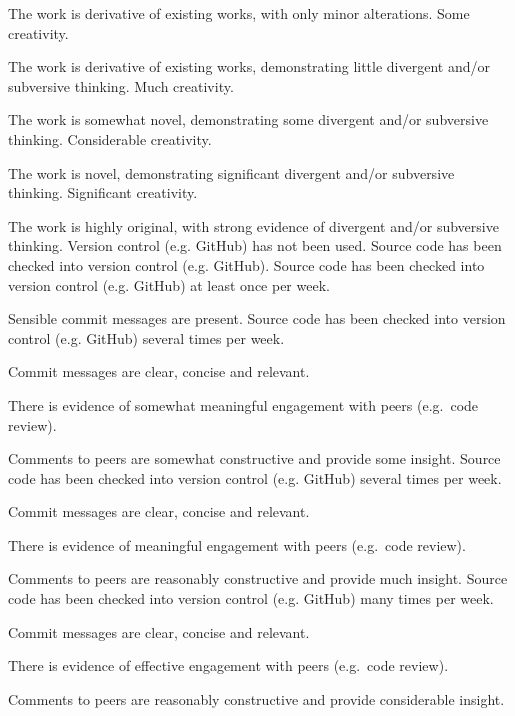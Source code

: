 \documentclass{../../fal_assignment}
\begin{document}
\begin{markingrubric}
	\par The work is derivative of existing works, with only minor alterations.
	\grade Some creativity.
	\par The work is derivative of existing works, demonstrating little divergent and/or subversive thinking.
	\grade Much creativity.
	\par The work is somewhat novel, demonstrating some divergent and/or subversive thinking.
	\grade Considerable creativity.
	\par The work is novel, demonstrating significant divergent and/or subversive thinking.
	\grade Significant creativity.
	\par The work is highly original, with strong evidence of divergent and/or subversive thinking.
	\grade\fail Version control (e.g. GitHub) has not been used.
	\grade Source code has been checked into version control (e.g. GitHub).
	\grade Source code has been checked into version control (e.g. GitHub) at least once per week.
	\par Sensible commit messages are present.
	\grade Source code  has been checked into version control (e.g. GitHub) several times per week.
	\par Commit messages are clear, concise and relevant.
	\par There is evidence of somewhat meaningful engagement with peers (e.g.\ code review).
	\par Comments to peers are somewhat constructive and provide some insight.
	\grade Source code has been checked into version control (e.g. GitHub) several times per week.
	\par Commit messages are clear, concise and relevant.
	\par There is evidence of meaningful engagement with peers (e.g.\ code review).
	\par Comments to peers are reasonably constructive and provide much insight.
	\grade Source code has been checked into version control (e.g. GitHub) many times per week.
	\par Commit messages are clear, concise and relevant.
	\par There is evidence of effective engagement with peers (e.g.\ code review).
	\par Comments to peers are reasonably constructive and provide considerable insight.
\end{markingrubric}
	
\end{document}
